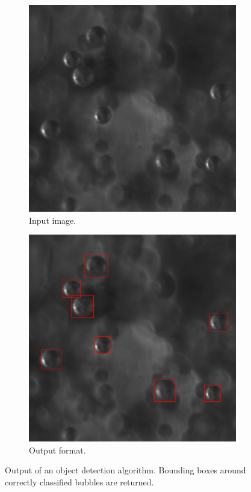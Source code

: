 		\begin{figure}
			\centering
			\begin{subfigure}[t]{0.4\linewidth}
				\includegraphics[scale=.4]{images/object_detection_intro_1.png}
				\caption{Input image.}
			\end{subfigure}
			
			\begin{subfigure}[t]{0.4\linewidth}
				\includegraphics[scale=.4]{images/object_detection_intro_2.png}
				\caption{Output format.}
			\end{subfigure}
			\caption{Output of an object detection algorithm. Bounding boxes around correctly classified bubbles are returned.}
			\label{fig:obj_detec_intro}
		\end{figure}
	
